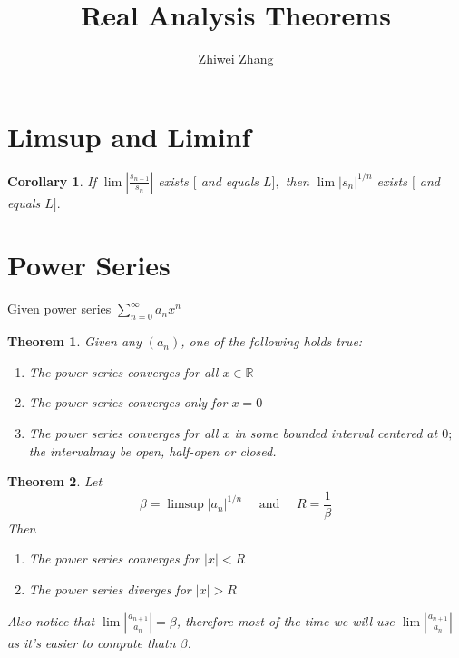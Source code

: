\documentclass[12pt]{article}
\newtheorem{theorem}{Theorem}[section]
\newtheorem{corollary}{Corollary}[theorem]
\begin{document}
 
 
 
\title{Real Analysis Theorems}
\author{Zhiwei Zhang}
 
\maketitle
\section{Limsup and Liminf}
\begin{corollary}
	If $\lim \left| \frac { s _ { n + 1 } } { s _ { n } } \right|$ exists $[$ and equals $L ] ,$ then $\lim \left| s _ { n } \right| ^ { 1 / n } $ exists $[$ and
	equals $L ] .$
\end{corollary}
\section{Power Series}
Given power series $\sum _ { n = 0 } ^ { \infty } a _ { n } x ^ { n }$
\begin{theorem}
Given any $(a_n)$, one of the following holds true:
\begin{enumerate}
	\item The power series converges for all $x \in \mathbb{R}$
	\item The power series converges only for $x = 0$
	\item The power series converges for all $x$ in some bounded interval centered at $0 ;$ the intervalmay be open, half-open or closed.
\end{enumerate}
\end{theorem}

\begin{theorem}
	Let $$
	\beta = \limsup \left| a _ { n } \right| ^ { 1 / n } \quad \text { and } \quad R = \frac { 1 } { \beta }
	$$
	Then
	\begin{enumerate}
		\item The power series converges for  $|x| < R$
		\item The power series diverges for $|x| > R$
	\end{enumerate}
	
	Also notice that $\lim \left| \frac { a _ { n + 1 } } { a _ { n } } \right| = \beta$, therefore most of the time we will use $\lim \left| \frac { a _ { n + 1 } } { a _ { n } } \right|$ as it's easier to compute thatn $\beta$.
\end{theorem}
\end{document}
